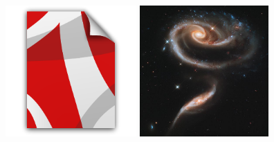 \documentclass{article}
\begin{document}
\includegraphics[width=\linewidth,height=5cm,keepaspectratio]{openclipart-sixsixfive-matt-icons_application-x-pdf.pdf}
\clearpage
\includegraphics[width=\linewidth,height=5cm,keepaspectratio]{UGC_1810_and_UGC_1813_in_Arp_273_(captured_by_the_Hubble_Space_Telescope).jpg}
\end{document}

